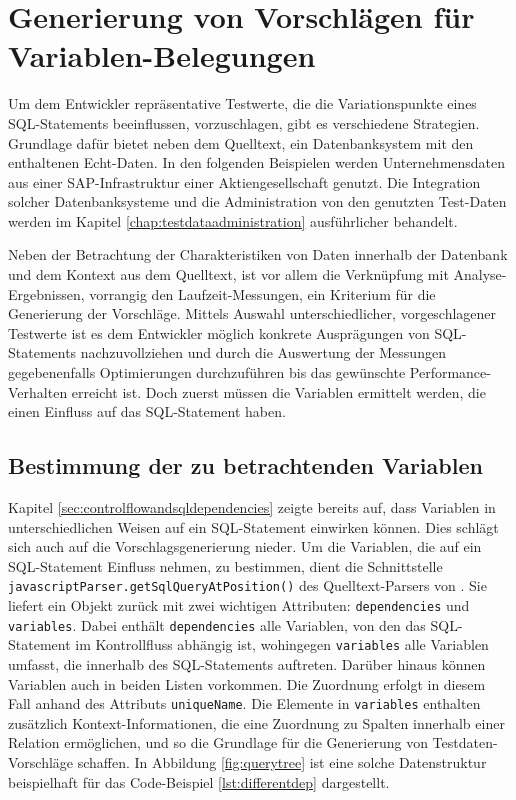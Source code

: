 \section{Generierung von Vorschlägen für Variablen-Belegungen}\label{chap:testdatasuggestions}

Um dem Entwickler repräsentative Testwerte, die die Variationspunkte eines SQL-Statements beeinflussen, vorzuschlagen, gibt es verschiedene Strategien.
Grundlage dafür bietet neben dem Quelltext, ein Datenbanksystem mit den enthaltenen Echt-Daten.
In den folgenden Beispielen werden Unternehmensdaten aus einer SAP-Infrastruktur einer Aktiengesellschaft genutzt.
Die Integration solcher Datenbanksysteme und die Administration von den genutzten Test-Daten werden im Kapitel \ref{chap:testdataadministration} ausführlicher behandelt.

Neben der Betrachtung der Charakteristiken von Daten innerhalb der Datenbank und dem Kontext aus dem Quelltext, ist vor allem die Verknüpfung mit Analyse-Ergebnissen, vorrangig den Laufzeit-Messungen, ein Kriterium für die Generierung der Vorschläge.
Mittels Auswahl unterschiedlicher, vorgeschlagener Testwerte ist es dem Entwickler möglich konkrete Ausprägungen von SQL-Statements nachzuvollziehen und durch die Auswertung der Messungen gegebenenfalls Optimierungen durchzuführen bis das gewünschte Performance-Verhalten erreicht ist.
Doch zuerst müssen die Variablen ermittelt werden, die einen Einfluss auf das SQL-Statement haben.

\subsection{Bestimmung der zu betrachtenden Variablen}
Kapitel \ref{sec:controlflowandsqldependencies} zeigte bereits auf, dass Variablen in unterschiedlichen Weisen auf ein SQL-Statement einwirken können.
Dies schlägt sich auch auf die Vorschlagsgenerierung nieder.
Um die Variablen, die auf ein SQL-Statement Einfluss nehmen, zu bestimmen, dient die Schnittstelle \texttt{javascriptParser.getSqlQueryAtPosition()} des Quelltext-Parsers von \cite{Horschig2014}.
Sie liefert ein Objekt zurück mit zwei wichtigen Attributen: \texttt{dependencies} und \texttt{variables}.
Dabei enthält \texttt{dependencies} alle Variablen, von den das SQL-Statement im Kontrollfluss abhängig ist, wohingegen \texttt{variables} alle Variablen umfasst, die innerhalb des SQL-Statements auftreten.
Darüber hinaus können Variablen auch in beiden Listen vorkommen.
Die Zuordnung erfolgt in diesem Fall anhand des Attributs \texttt{uniqueName}.
Die Elemente in \texttt{variables} enthalten zusätzlich Kontext-Informationen, die eine Zuordnung zu Spalten innerhalb einer Relation ermöglichen, und so die Grundlage für die Generierung von Testdaten-Vorschläge schaffen.
In Abbildung \ref{fig:querytree} ist eine solche Datenstruktur beispielhaft für das Code-Beispiel \ref{lst:differentdep} dargestellt.

